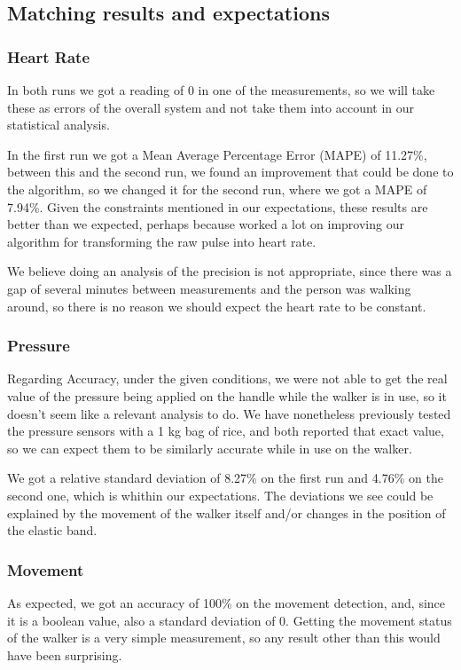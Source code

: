 	\subsection{Matching results and expectations}
		\subsubsection{Heart Rate}
			In both runs we got a reading of 0 in one of the measurements, so we will take these as errors of the overall system and not take them into account in our statistical analysis.

			In the first run we got a Mean Average Percentage Error (MAPE) of 11.27\%, between this and the second run, we found an improvement that could be done to the algorithm, so we changed it for the second run, where we got a MAPE of 7.94\%. Given the constraints mentioned in our expectations, these results are better than we expected, perhaps because worked a lot on improving our algorithm for transforming the raw pulse into heart rate.

			We believe doing an analysis of the precision is not appropriate, since there was a gap of several minutes between measurements and the person was walking around, so there is no reason we should expect the heart rate to be constant.

		\subsubsection{Pressure}
			Regarding Accuracy, under the given conditions, we were not able to get the real value of the pressure being applied on the handle while the walker is in use, so it doesn't seem like a relevant analysis to do. We have nonetheless previously tested the pressure sensors with a 1 kg bag of rice, and both reported that exact value, so we can expect them to be similarly accurate while in use on the walker.

			We got a relative standard deviation of 8.27\% on the first run and 4.76\% on the second one, which is whithin our expectations. The deviations we see could be explained by the movement of the walker itself and/or changes in the position of the elastic band.

		\subsubsection{Movement}
			As expected, we got an accuracy of 100\% on the movement detection, and, since it is a boolean value, also a standard deviation of 0. Getting the movement status of the walker is a very simple measurement, so any result other than this would have been surprising.

